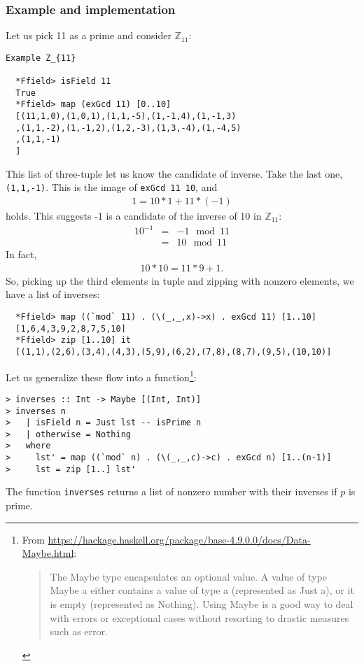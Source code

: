 \documentclass[11pt]{book}
\begin{document}
\subsubsection{Example and implementation}
Let us pick 11 as a prime and consider $\mathbb{Z}_{11}$:
\begin{verbatim}
Example Z_{11}

  *Ffield> isField 11
  True
  *Ffield> map (exGcd 11) [0..10]
  [(11,1,0),(1,0,1),(1,1,-5),(1,-1,4),(1,-1,3)
  ,(1,1,-2),(1,-1,2),(1,2,-3),(1,3,-4),(1,-4,5)
  ,(1,1,-1)
  ]
\end{verbatim}
This list of three-tuple let us know the candidate of inverse.
Take the last one, \verb+(1,1,-1)+.
This is the image of \verb+exGcd 11 10+, and 
\begin{eqnarray}
1 = 10*1 + 11*(-1)
\end{eqnarray}
holds.
This suggests -1 is a candidate of the inverse of 10 in $\mathbb{Z}_{11}$:
\begin{eqnarray}
10^{-1} &=& -1 \mod 11 \\
&=& 10 \mod 11
\end{eqnarray}
In fact,
\begin{eqnarray}
10*10 = 11*9+1.
\end{eqnarray}
So, picking up the third elements in tuple and zipping with nonzero elements, we have a list of inverses:
\begin{verbatim}
  *Ffield> map ((`mod` 11) . (\(_,_,x)->x) . exGcd 11) [1..10] 
  [1,6,4,3,9,2,8,7,5,10]
  *Ffield> zip [1..10] it
  [(1,1),(2,6),(3,4),(4,3),(5,9),(6,2),(7,8),(8,7),(9,5),(10,10)]
\end{verbatim}

Let us generalize these flow into a function\footnote{
From \url{https://hackage.haskell.org/package/base-4.9.0.0/docs/Data-Maybe.html}:
\begin{quotation}
The Maybe type encapsulates an optional value. 
A value of type Maybe a either contains a value of type a (represented as Just a), or it is empty (represented as Nothing). 
Using Maybe is a good way to deal with errors or exceptional cases without resorting to drastic measures such as error.
\end{quotation}
}:
\begin{verbatim}
> inverses :: Int -> Maybe [(Int, Int)]
> inverses n
>   | isField n = Just lst -- isPrime n
>   | otherwise = Nothing
>   where
>     lst' = map ((`mod` n) . (\(_,_,c)->c) . exGcd n) [1..(n-1)]
>     lst = zip [1..] lst'
\end{verbatim}
The function \texttt{inverses} returns a list of nonzero number with their inverses if $p$ is prime.
\end{document}
